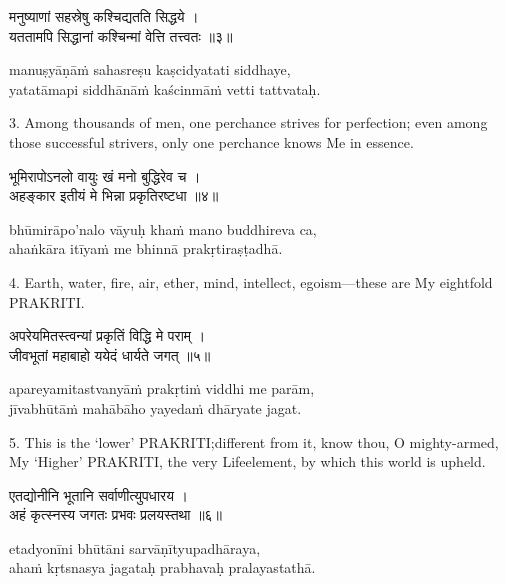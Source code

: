 \begin{gitaverse}
मनुष्याणां सहस्रेषु कश्चिद्यतति सिद्धये । \\
यततामपि सिद्धानां कश्चिन्मां वेत्ति तत्त्वतः ॥३॥
\end{gitaverse}

\begin{transliteration}
manuṣyāṇāṁ sahasreṣu kaṣcidyatati siddhaye, \\
yatatāmapi siddhānāṁ kaścinmāṁ vetti tattvataḥ.
\end{transliteration}

3. Among thousands of men, one perchance strives for perfection; even among
those successful strivers, only one perchance knows Me in essence.

\begin{gitaverse}
भूमिरापोऽनलो वायुः खं मनो बुद्धिरेव च । \\
अहङ्कार इतीयं मे भिन्ना प्रकृतिरष्टधा ॥४॥
\end{gitaverse}

\begin{transliteration}
bhūmirāpo'nalo vāyuḥ khaṁ mano buddhireva ca, \\
ahaṅkāra itīyaṁ me bhinnā prakṛtiraṣṭadhā.
\end{transliteration}

4. Earth, water, fire, air, ether, mind, intellect, egoism---these are My
eightfold PRAKRITI.\@

\begin{gitaverse}
अपरेयमितस्त्वन्यां प्रकृतिं विद्धि मे पराम् । \\
जीवभूतां महाबाहो ययेदं धार्यते जगत् ॥५॥
\end{gitaverse}

\begin{transliteration}
apareyamitastvanyāṁ prakṛtiṁ viddhi me parām, \\
jīvabhūtāṁ mahābāho yayedaṁ dhāryate jagat.
\end{transliteration}

5. This is the `lower' PRAKRITI;\@ different from it, know thou, O
mighty-armed, My `Higher' PRAKRITI, the very Lifeelement, by which this world
is upheld.

\begin{gitaverse}
एतद्योनीनि भूतानि सर्वाणीत्युपधारय । \\
अहं कृत्स्नस्य जगतः प्रभवः प्रलयस्तथा ॥६॥
\end{gitaverse}

\begin{transliteration}
etadyonīni bhūtāni sarvāṇītyupadhāraya, \\
ahaṁ kṛtsnasya jagataḥ prabhavaḥ pralayastathā.
\end{transliteration}

